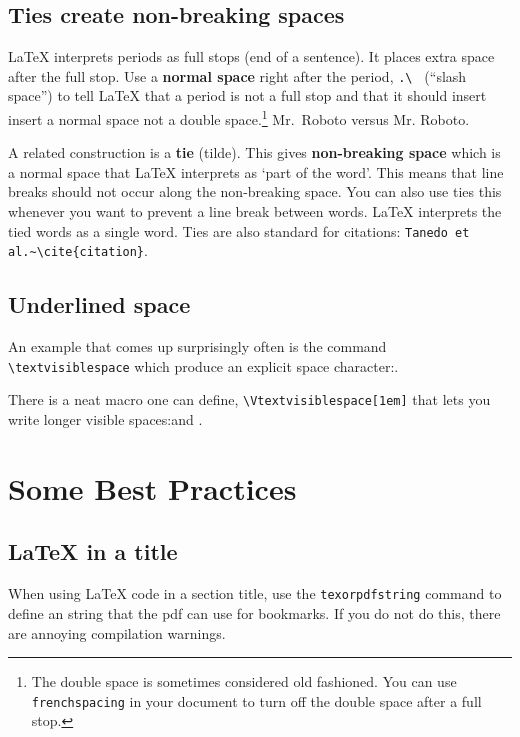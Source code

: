 \subsection{Ties create non-breaking spaces}

\LaTeX{} interprets periods as full stops (end of a sentence). It places extra space after the full stop. Use a \textbf{normal space} right after the period, \verb!.\ ! (``slash space'') to tell \LaTeX{} that a period is not a full stop and that it should insert insert a normal space not a double space.\footnote{The double space is sometimes considered old fashioned. You can use \texttt{frenchspacing} in your document to turn off the double space after a full stop.} Mr.\ Roboto versus Mr. Roboto. 


A related construction is a \textbf{tie} (tilde). This gives \textbf{non-breaking space} which is a normal space that \LaTeX{} interprets as `part of the word'. This means that line breaks should not occur along the non-breaking space.
% 
You can also use ties this whenever you want to prevent a line break between words. \LaTeX{} interprets the tied words as a single word.
% 
Ties are also standard for citations: \verb!Tanedo et al.~\cite{citation}!. 


\subsection{Underlined space}

An example that comes up surprisingly often is the command \verb!\textvisiblespace! which produce an explicit space character:\textvisiblespace.

There is a neat macro one can define, \verb!\Vtextvisiblespace[1em]! that lets you write longer visible spaces:\Vtextvisiblespace[1em] and \Vtextvisiblespace[2em].

\section{Some Best Practices}

\subsection{\texorpdfstring{\LaTeX{} in a title}{LaTeX in a title}}

When using \LaTeX{} code in a section title, use the \texttt{texorpdfstring} command to define an  string that the pdf can use for bookmarks. If you do not do this, there are annoying compilation warnings.


